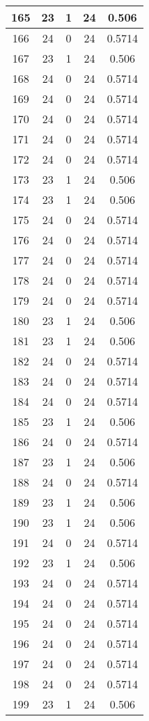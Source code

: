 \documentclass[letterpaper, 12pt]{article}
\begin{document}
\begin{longtable}{|c|c|c|c|c|}
\hline
165 & 23 & 1 & 24 & 0.506 \\
\hline
166 & 24 & 0 & 24 & 0.5714 \\
\hline
167 & 23 & 1 & 24 & 0.506 \\
\hline
168 & 24 & 0 & 24 & 0.5714 \\
\hline
169 & 24 & 0 & 24 & 0.5714 \\
\hline
170 & 24 & 0 & 24 & 0.5714 \\
\hline
171 & 24 & 0 & 24 & 0.5714 \\
\hline
172 & 24 & 0 & 24 & 0.5714 \\
\hline
173 & 23 & 1 & 24 & 0.506 \\
\hline
174 & 23 & 1 & 24 & 0.506 \\
\hline
175 & 24 & 0 & 24 & 0.5714 \\
\hline
176 & 24 & 0 & 24 & 0.5714 \\
\hline
177 & 24 & 0 & 24 & 0.5714 \\
\hline
178 & 24 & 0 & 24 & 0.5714 \\
\hline
179 & 24 & 0 & 24 & 0.5714 \\
\hline
180 & 23 & 1 & 24 & 0.506 \\
\hline
181 & 23 & 1 & 24 & 0.506 \\
\hline
182 & 24 & 0 & 24 & 0.5714 \\
\hline
183 & 24 & 0 & 24 & 0.5714 \\
\hline
184 & 24 & 0 & 24 & 0.5714 \\
\hline
185 & 23 & 1 & 24 & 0.506 \\
\hline
186 & 24 & 0 & 24 & 0.5714 \\
\hline
187 & 23 & 1 & 24 & 0.506 \\
\hline
188 & 24 & 0 & 24 & 0.5714 \\
\hline
189 & 23 & 1 & 24 & 0.506 \\
\hline
190 & 23 & 1 & 24 & 0.506 \\
\hline
191 & 24 & 0 & 24 & 0.5714 \\
\hline
192 & 23 & 1 & 24 & 0.506 \\
\hline
193 & 24 & 0 & 24 & 0.5714 \\
\hline
194 & 24 & 0 & 24 & 0.5714 \\
\hline
195 & 24 & 0 & 24 & 0.5714 \\
\hline
196 & 24 & 0 & 24 & 0.5714 \\
\hline
197 & 24 & 0 & 24 & 0.5714 \\
\hline
198 & 24 & 0 & 24 & 0.5714 \\
\hline
199 & 23 & 1 & 24 & 0.506 \\
\hline
\end{longtable}
\end{document}
